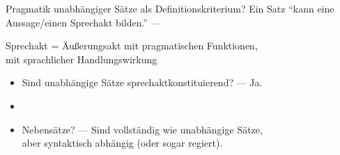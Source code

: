 \begin{frame}
  {Pragmatik unabhängiger Sätze als Definitionskriterium?}
  \pause
  Ein Satz "`kann eine Aussage\slash einen Sprechakt bilden."' \pause --- 
  \pause
  \begin{exe}
    \ex\label{ex:hauptsatzundmatrixsatz007}
    \begin{xlist}
      \pause
      \pause
      \pause
    \end{xlist}
  \end{exe}
  \pause
  Sprechakt = Äußerungsakt mit pragmatischen Funktionen,\\
  mit sprachlicher Handlungswirkung
  \Viertelzeile
  \pause
  \begin{itemize}[<+->]
    \item Sind unabhängige Sätze \alert{sprechaktkonstituierend}? --- Ja.
    \item {}
    \item \alert{Nebensätze}? --- Sind \alert{vollständig} wie unabhängige Sätze,\\
      aber \alert{syntaktisch abhängig} (oder sogar \alert{regiert}).
  \end{itemize}
\end{frame}



